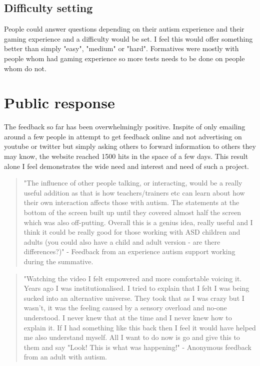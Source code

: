 \subsection{Difficulty setting}
People could answer questions depending on their autism experience and their gaming experience and a difficulty would be set. I feel this would offer something better than simply "easy", "medium" or "hard". Formatives were mostly with people whom had gaming experience so more tests needs to be done on people whom do not.

\section{Public response}
The feedback so far has been overwhelmingly positive. Inspite of only emailing around a few people in attempt to get feedback online and not advertising on youtube or twitter but simply asking others to forward information to others they may know, the website reached 1500 hits in the space of a few days. This result alone I feel demonstrates the wide need and interest and need of such a project. 

\begin{quote}
"The influence of other people talking, or interacting, would be a really useful addition as that is how teachers/trainers etc can learn about how their own interaction affects those with autism. The statements at the bottom of the screen built up until they covered almost half the screen which was also off-putting. Overall this is a genius idea, really useful and I think it could be really good for those working with ASD children and adults (you could also have a child and adult version - are there differences?)" - Feedback from an experience autism support working during the summative.
\end{quote}

\begin{quote}
"Watching the video I felt empowered and more comfortable voicing it. Years ago I was institutionalised. I tried to explain that I felt I was being sucked into an alternative universe. They took that as I was crazy but I wasn't, it was the feeling caused by a sensory overload and no-one understood. I never knew that at the time and I never knew how to explain it. If I had something like this back then I feel it would have helped me also understand myself. All I want to do now is go and give this to them and say "Look! This is what was happening!" - Anonymous feedback from an adult with autism.
\end{quote}

